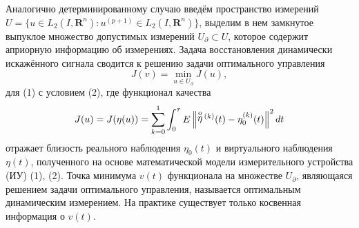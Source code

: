 

Аналогично детерминированному случаю введём прост\-ранст\-во измерений $U \!=\! \{ u \in L_{2} (I,{\mathbf R}^{n}) : u^{(p+1)} \in L_{2} (I,{\mathbf R}^{n} )\} $, выделим в нем замкнутое выпуклое множество допустимых измерений $U_{\partial}\subset U$, которое содержит априорную информацию об измерениях. Задача восстановления динамически искажённого сигнала сводится к решению задачи оптимального управления
 $$
 J(v)=\mathop{\min }\limits_{u\in U_{\partial } } J(u),
 $$
для (1) с условием (2), где функционал качества
  $$ J(u)=J(\eta (u))=\sum _{k=0}^{1}\int _{0}^{\tau }E\left\| \mathop{\eta }\limits^{{\rm o}}{}^{(k)} (t)-\eta _{0}^{(k)} (t)\right\| ^{2} dt
  $$
отражает близость реального наблюдения $\eta_{0} (t)$ и виртуального наблюдения $\eta (t)$, полученного на основе математической модели измерительного устройства (ИУ) (1), (2).
	 Точка минимума $v(t)$ функционала на множестве $U_{\partial } $, являющаяся решением задачи оптимального управления, называется оптимальным динамическим измерением. На практике существует только косвенная информация о $v(t)$.
	
